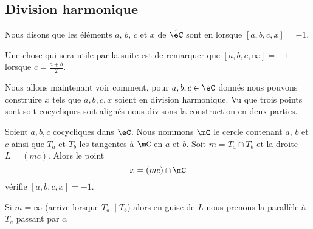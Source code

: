 \subsection{Division harmonique}

\begin{definition}
    Nous disons que les éléments \( a\), \( b\), \( c\) et \( x\) de \( \hat \eC\) sont en  lorsque \( [a,b,c,x]=-1\).
\end{definition}

\begin{normaltext}      \label{NORMooUWYDooAZTTWu}
    Une chose qui sera utile par la suite est de remarquer que \( [a,b,c,\infty]=-1\) lorsque \( c=\frac{ a+b }{ 2 }\).
\end{normaltext}

Nous allons maintenant voir comment, pour \( a,b,c\in \eC\) donnés nous pouvons construire \( x\) tels que \( a,b,c,x\) soient en division harmonique. Vu que trois points sont soit cocycliques soit alignés nous divisons la construction en deux parties.

\begin{lemma}
    Soient \( a,b,c\) cocycliques dans \( \eC\). Nous nommons \( \mC\) le cercle contenant \( a\), \( b\) et \( c\) ainsi que \( T_a\) et \( T_b\) les tangentes à \( \mC\) en \( a\) et \( b\). Soit \( m=T_a\cap T_b\) et la droite \( L=(mc)\). Alors le point
    \begin{equation}
        x=(mc)\cap \mC
    \end{equation}
    vérifie \( [a,b,c,x]=-1\).

    Si \( m=\infty\) (arrive lorsque \( T_a\parallel T_b\)) alors en guise de \( L\) nous prenons la parallèle à \( T_a\) passant par \( c\).
\end{lemma}

